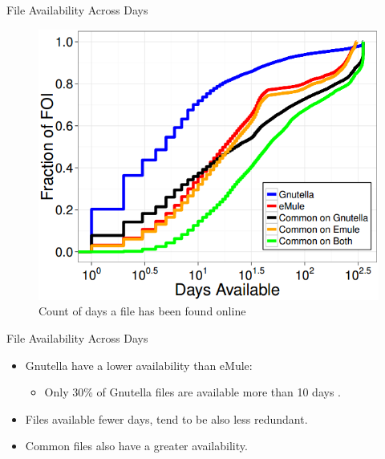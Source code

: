 \documentclass[notes]{beamer}
\begin{document}
\begin{frame}

\begin{block}{File Availability Across Days}

\begin{figure}[!htb]
\centering
\includegraphics[scale=0.5]{FOI_availability}
\caption{Count of days a file has been found online}
\label{fig:FOI_availability}
\end{figure}

\end{block}

\end{frame}

\begin{frame}

\begin{block}{File Availability Across Days}

\begin{itemize}

\item[\checkmark]Gnutella have a lower availability than eMule:

	\begin{itemize}

	\item Only 30\% of Gnutella files are available more than 10 days	.
	
	\end{itemize}

\item[\checkmark]Files available fewer days, tend to be also less redundant.

\item[\checkmark]Common files also have a greater availability.

\end{itemize}

\end{block}

\end{frame}
\end{document}

